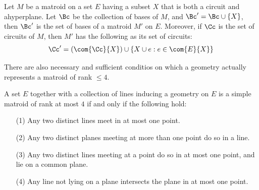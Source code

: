 \begin{theorem}\label{1.5.4}
    Let $M$ be a matroid on a set $E$ having a subset $X$ that is both a circuit
    and ahyperplane. Let $\Bc$ be the collection of bases of $M$, and  $\Bc'=\Bc
    \cup \{X\}$, then $\Bc'$ is the set of bases of a matroid $M'$ on $E$.
    Moreover, if $\Cc$ is the set of circuits of  $M$, then  $M'$ has the
    following as its set of circuits:
    \begin{equation*}
        \Cc'=(\com{\Cc}{X}) \cup \{X \cup e : e \in \com{E}{X}\}
    \end{equation*}
\end{theorem}

There are also necessary and sufficient conditios on which a geometry actually
represents a matroid of rank $\leq 4$.

\begin{theorem}\label{1.5.6}
    A set $E$ together with a collection of lines inducing a geometry on  $E$ is
    a simple matroid of rank at most $4$ if and only if the following hold:
    \begin{enumerate}
        \item[(1)] Any two distinct lines meet in at most one point.

        \item[(2)] Any two distinct planes meeting at more than one point do so
            in a line.

        \item[(3)] Any two distinct lines meeting at a point do so in at most
            one point, and lie on a common plane.

        \item[(4)] Any line not lying on a plane intersects the plane in at most
            one point.
    \end{enumerate}
\end{theorem}

